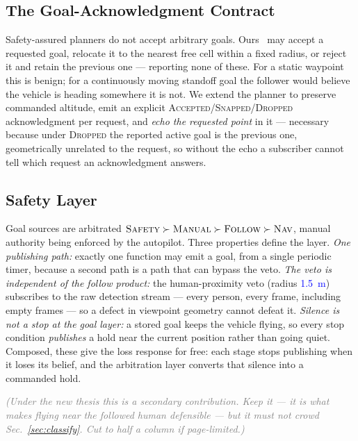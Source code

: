 \documentclass[conference]{IEEEtran}
\newcommand{\bench}[1]{\textcolor{blue}{#1}}
\newcommand{\note}[1]{\textcolor{gray}{\textit{(#1)}}}
\begin{document}
\subsection{The Goal-Acknowledgment Contract}
\label{sec:goalcontract}
Safety-assured planners do not accept arbitrary goals. Ours~\cite{ren2025super}
may accept a requested goal, relocate it to the nearest free cell within a fixed
radius, or reject it and retain the previous one --- reporting none of these. For
a static waypoint this is benign; for a continuously moving standoff goal the
follower would believe the vehicle is heading somewhere it is not. We extend the
planner to preserve commanded altitude, emit an explicit
\textsc{Accepted}/\textsc{Snapped}/\textsc{Dropped} acknowledgment per request,
and \emph{echo the requested point} in it --- necessary because under
\textsc{Dropped} the reported active goal is the previous one, geometrically
unrelated to the request, so without the echo a subscriber cannot tell which
request an acknowledgment answers.

\subsection{Safety Layer}
\label{sec:safety}
Goal sources are arbitrated
$\textsc{Safety} \succ \textsc{Manual} \succ \textsc{Follow} \succ \textsc{Nav}$,
manual authority being enforced by the autopilot. Three properties define the
layer. \emph{One publishing path:} exactly one function may emit a goal, from a
single periodic timer, because a second path is a path that can bypass the veto.
\emph{The veto is independent of the follow product:} the human-proximity veto
(radius \bench{\SI{1.5}{\meter}}) subscribes to the raw detection stream --- every
person, every frame, including empty frames --- so a defect in viewpoint geometry
cannot defeat it. \emph{Silence is not a stop at the goal layer:} a stored goal
keeps the vehicle flying, so every stop condition \emph{publishes} a hold near
the current position rather than going quiet. Composed, these give the loss
response for free: each stage stops publishing when it loses its belief, and the
arbitration layer converts that silence into a commanded hold.

\note{Under the new thesis this is a secondary contribution. Keep it --- it is
what makes flying near the followed human defensible --- but it must not crowd
Sec.~\ref{sec:classify}. Cut to half a column if page-limited.}

\end{document}
